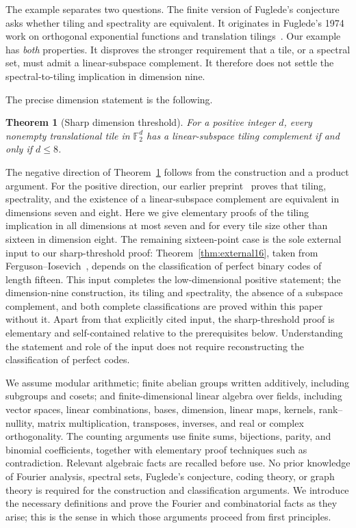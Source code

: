 \documentclass[11pt]{article}
\numberwithin{equation}{section}
\newtheorem{theorem}{Theorem}[section]
\theoremstyle{definition}
\theoremstyle{remark}\newtheorem{remark}[theorem]{Remark}
\newcommand{\F}{\mathbb F_2}
\begin{document}
The example separates two questions. The finite version of Fuglede's conjecture asks whether tiling and spectrality are equivalent. It originates in Fuglede's 1974 work on orthogonal exponential functions and translation tilings~\cite{Fuglede}. Our example has \emph{both} properties. It disproves the stronger requirement that a tile, or a spectral set, must admit a linear-subspace complement. It therefore does not settle the spectral-to-tiling implication in dimension nine.

The precise dimension statement is the following.
\begin{theorem}[Sharp dimension threshold]\label{thm:threshold}
For a positive integer $d$, every nonempty translational tile in $\F^d$ has a linear-subspace tiling complement if and only if $d\le8$.
\end{theorem}

The negative direction of Theorem~\ref{thm:threshold} follows from the construction and a product argument. For the positive direction, our earlier preprint~\cite[Theorem~1.1]{FI} proves that tiling, spectrality, and the existence of a linear-subspace complement are equivalent in dimensions seven and eight. Here we give elementary proofs of the tiling implication in all dimensions at most seven and for every tile size other than sixteen in dimension eight. The remaining sixteen-point case is the sole external input to our sharp-threshold proof: Theorem~\ref{thm:external16}, taken from Ferguson--Iosevich~\cite[Lemma~6.5]{FI}, depends on the classification of perfect binary codes of length fifteen. This input completes the low-dimensional positive statement; the dimension-nine construction, its tiling and spectrality, the absence of a subspace complement, and both complete classifications are proved within this paper without it. Apart from that explicitly cited input, the sharp-threshold proof is elementary and self-contained relative to the prerequisites below. Understanding the statement and role of the input does not require reconstructing the classification of perfect codes.

We assume modular arithmetic; finite abelian groups written additively, including subgroups and cosets; and finite-dimensional linear algebra over fields, including vector spaces, linear combinations, bases, dimension, linear maps, kernels, rank--nullity, matrix multiplication, transposes, inverses, and real or complex orthogonality. The counting arguments use finite sums, bijections, parity, and binomial coefficients, together with elementary proof techniques such as contradiction. Relevant algebraic facts are recalled before use. No prior knowledge of Fourier analysis, spectral sets, Fuglede's conjecture, coding theory, or graph theory is required for the construction and classification arguments. We introduce the necessary definitions and prove the Fourier and combinatorial facts as they arise; this is the sense in which those arguments proceed from first principles.
\end{document}
